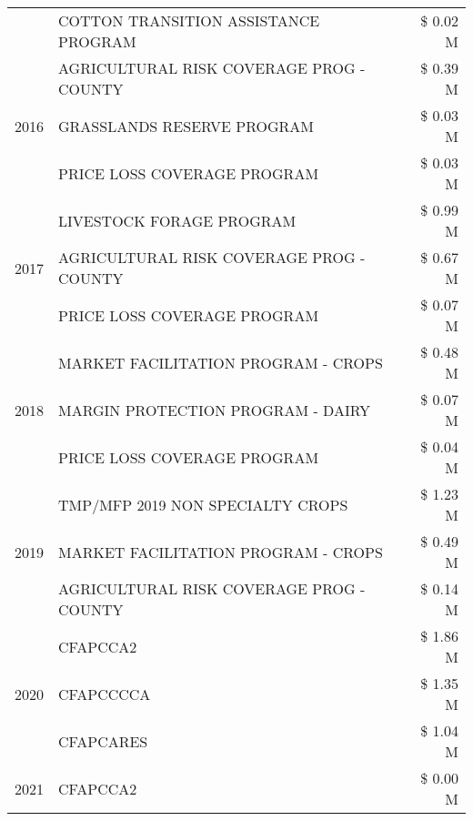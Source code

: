 \begin{tabular}{llr}
 & COTTON TRANSITION ASSISTANCE PROGRAM & \$ 0.02 M \\
\cline{1-3}
\multirow[t]{3}{*}{2016} & AGRICULTURAL RISK COVERAGE PROG - COUNTY & \$ 0.39 M \\
 & GRASSLANDS RESERVE PROGRAM & \$ 0.03 M \\
 & PRICE LOSS COVERAGE PROGRAM & \$ 0.03 M \\
\cline{1-3}
\multirow[t]{3}{*}{2017} & LIVESTOCK FORAGE PROGRAM & \$ 0.99 M \\
 & AGRICULTURAL RISK COVERAGE PROG - COUNTY & \$ 0.67 M \\
 & PRICE LOSS COVERAGE PROGRAM & \$ 0.07 M \\
\cline{1-3}
\multirow[t]{3}{*}{2018} & MARKET FACILITATION PROGRAM - CROPS & \$ 0.48 M \\
 & MARGIN PROTECTION PROGRAM - DAIRY & \$ 0.07 M \\
 & PRICE LOSS COVERAGE PROGRAM & \$ 0.04 M \\
\cline{1-3}
\multirow[t]{3}{*}{2019} & TMP/MFP 2019 NON SPECIALTY CROPS & \$ 1.23 M \\
 & MARKET FACILITATION PROGRAM - CROPS & \$ 0.49 M \\
 & AGRICULTURAL RISK COVERAGE PROG - COUNTY & \$ 0.14 M \\
\cline{1-3}
\multirow[t]{3}{*}{2020} & CFAPCCA2 & \$ 1.86 M \\
 & CFAPCCCCA & \$ 1.35 M \\
 & CFAPCARES & \$ 1.04 M \\
\cline{1-3}
2021 & CFAPCCA2 & \$ 0.00 M \\
\cline{1-3}
\bottomrule
\end{tabular}
